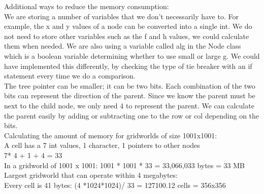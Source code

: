\documentclass[a4paper]{article}
\theoremstyle{definition}
\theoremstyle{plain}
\begin{document}
Additional ways to reduce the memory consumption:\\
We are storing a number of variables that we don’t necessarily have to. For example, the x and y values of a node can be converted into a single int. We do not need to store other variables such as the f and h values, we could calculate them when needed. We are also using a variable called alg in the Node class which is a boolean variable determining whether to use small or large g. We could have implemented this differently, by checking the type of tie breaker with an if statement every time we do a comparison. \\
The tree pointer can be smaller; it can be two bits. Each combination of the two bits can represent the direction of the parent. Since we know the parent must be next to the child node, we only need 4 to represent the parent. We can calculate the parent easily by adding or subtracting one to the row or col depending on the bits.\\
Calculating the amount of memory for gridworlds of size 1001x1001:\\
A cell has a 7 int values, 1 character, 1 pointers to other nodes\\
7* 4 + 1 + 4 = 33\\
In a gridworld of 1001 x 1001: 1001 * 1001 * 33 = 33,066,033 bytes = 33 MB\\
Largest gridworld that can operate within 4 megabytes: \\
Every cell is 41 bytes: (4 *1024*1024)/ 33 = 127100.12 cells = 356x356\\
\end{document}
